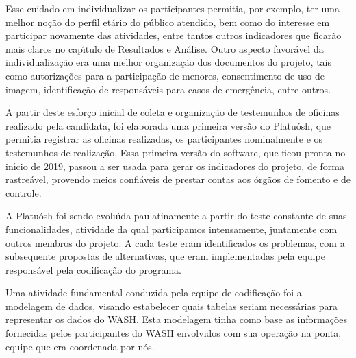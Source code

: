 \documentclass[
12pt,		%
openright,	%
twoside,  %
a4paper,			%
chapter=TITLE,		%
english,			%
french,				%
spanish,			%
brazil				%
]{USPSC-classe/USPSC}
\begin{document}
Esse cuidado em individualizar os participantes permitia, por exemplo, ter uma melhor no\c{c}\~ao do perfil et\'ario do p\'ublico atendido, bem como do interesse em participar novamente das atividades, entre tantos outros indicadores que ficar\~ao mais claros no cap\'{\i}tulo de Resultados e An\'alise. Outro aspecto favor\'avel da individualiza\c{c}\~ao era uma melhor organiza\c{c}\~ao dos documentos do projeto, tais como autoriza\c{c}\~oes para a participa\c{c}\~ao de menores, consentimento de uso de imagem, identifica\c{c}\~ao de respons\'aveis para casos de emerg\^encia, entre outros.














A partir deste esfor\c{c}o inicial de coleta e organiza\c{c}\~ao de testemunhos de oficinas realizado pela candidata, foi elaborada uma primeira vers\~ao do Platu\'osh, que permitia registrar as oficinas realizadas, os participantes nominalmente e os testemunhos de realiza\c{c}\~ao. Essa primeira vers\~ao do software, que ficou pronta no in\'{\i}cio de 2019, passou a ser usada para gerar os indicadores do projeto, de forma rastre\'avel, provendo meios confi\'aveis de prestar contas aos \'org\~aos de fomento e de controle.














A Platu\'osh foi sendo evolu\'{\i}da paulatinamente a partir do teste constante de suas funcionalidades, atividade da qual participamos intensamente, juntamente com outros membros do projeto. A cada teste eram identificados os problemas, com a subsequente propostas de alternativas, que eram implementadas pela equipe respons\'avel pela codifica\c{c}\~ao do programa.














Uma atividade fundamental conduzida pela equipe de codifica\c{c}\~ao foi a modelagem de dados, visando estabelecer quais tabelas seriam necess\'arias para representar os dados do WASH. Esta modelagem tinha como base as informa\c{c}\~oes fornecidas pelos participantes do WASH envolvidos com sua opera\c{c}\~ao na ponta, equipe que era coordenada por n\'os.
\end{document}
